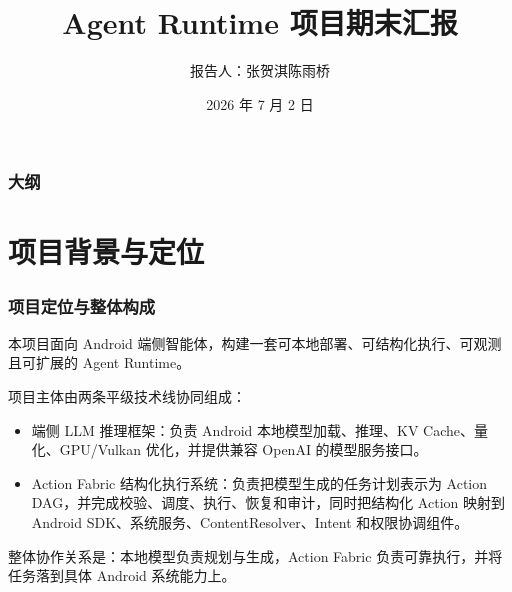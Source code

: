 \documentclass[aspectratio=169]{ctexbeamer}
\title[Agent Runtime]{
    Agent Runtime 项目期末汇报
}
\author[张贺淇]{报告人：张贺淇\quad 陈雨桥}
\institute[USTC]{
中国科学技术大学
}
\date{2026 年 7 月 2 日}
\begin{document}
\maketitleframe

\begin{frame}%
    \frametitle{大纲}%
    \tableofcontents[hideallsubsections]%
\end{frame}%



\section{项目背景与定位}

\begin{frame}
  \frametitle{项目定位与整体构成}
  本项目面向 Android 端侧智能体，构建一套可本地部署、可结构化执行、可观测且可扩展的 Agent Runtime。

  \vspace{0.5em}
  项目主体由两条平级技术线协同组成：
  \begin{itemize}
    \item 端侧 LLM 推理框架：负责 Android 本地模型加载、推理、KV Cache、量化、GPU/Vulkan 优化，并提供兼容 OpenAI 的模型服务接口。
    \item Action Fabric 结构化执行系统：负责把模型生成的任务计划表示为 Action DAG，并完成校验、调度、执行、恢复和审计，同时把结构化 Action 映射到 Android SDK、系统服务、ContentResolver、Intent 和权限协调组件。
  \end{itemize}

  \vspace{0.5em}
  整体协作关系是：本地模型负责规划与生成，Action Fabric 负责可靠执行，并将任务落到具体 Android 系统能力上。
\end{frame}
\end{document}
